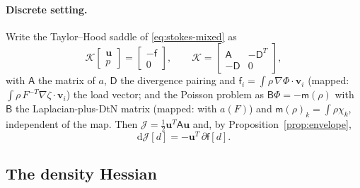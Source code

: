\documentclass[11pt]{article}
\newcommand{\Jf}{\mathscr{J}}  %
\newcommand{\bu}{\mathbf{u}}
\newcommand{\bv}{\mathbf{v}}
\begin{document}
\paragraph{Discrete setting.} Write the Taylor--Hood saddle of
\eqref{eq:stokes-mixed} as
\begin{equation}
  \mathcal{K}\begin{bmatrix}\bu\\ p\end{bmatrix}
  = \begin{bmatrix}-\mathsf{f}\\ 0\end{bmatrix},
  \qquad
  \mathcal{K} = \begin{bmatrix} \mathsf{A} & -\mathsf{D}^{T}\\
                 -\mathsf{D} & 0\end{bmatrix},
  \label{eq:saddle-discrete}
\end{equation}
with $\mathsf{A}$ the matrix of $a$, $\mathsf{D}$ the divergence pairing
and $\mathsf{f}_i = \int\rho\,\nabla\Phi\cdot\bv_i$ (mapped:
$\int\rho\,F^{-T}\nabla\zeta\cdot\bv_i$) the load vector; and the Poisson
problem as $\mathsf{B}\Phi = -\mathsf{m}(\rho)$ with $\mathsf{B}$ the
Laplacian-plus-DtN matrix (mapped: with $a(F)$) and $\mathsf{m}(\rho)_k =
\int\rho\chi_k$, independent of the map. Then $\Jf  = \tfrac12\bu^{T}
\mathsf{A}\bu$ and, by Proposition~\ref{prop:envelope},
\begin{equation}
  \mathrm{d}\Jf [d] = -\bu^{T}\,\partial\mathsf{f}[d] .
  \label{eq:dJ-discrete}
\end{equation}

\subsection{The density Hessian}
\label{sec:hessian}
\end{document}
